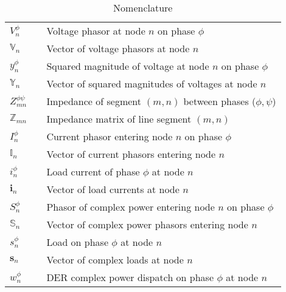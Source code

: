 \begin{table}[t]
\caption{Nomenclature}
\centering
\begin{tabulary}{\textwidth}{LLL}
	\hline
	\hline
\noindent $V_{n}^{\phi}$ & & Voltage phasor at node $n$ on phase $\phi$ \\
\noindent $\mathbb{V}_{n}$ & & Vector of voltage phasors at node $n$ \\
\noindent $y_{n}^{\phi}$ & & Squared magnitude of voltage at node $n$ on phase $\phi$ \\
\noindent $\mathbb{Y}_{n}$ & & Vector of squared magnitudes of voltages at node $n$ \\
\noindent $Z_{mn}^{\phi \psi}$ & & Impedance of segment $(m,n)$ between phases ($\phi,\psi$) \\
\noindent $\mathbb{Z}_{mn}$ & & Impedance matrix of line segment $(m,n)$ \\
\noindent $I_{n}^{\phi}$ & & Current phasor entering node $n$ on phase $\phi$ \\
\noindent $\mathbb{I}_{n}$ & & Vector of current phasors entering node $n$ \\
\noindent $i_{n}^{\phi}$ & & Load current of phase $\phi$ at node $n$ \\
\noindent $\mathbf{i}_{n}$ & & Vector of load currents at node $n$ \\
\noindent $S_{n}^{\phi}$ & & Phasor of complex power entering node $n$ on phase $\phi$ \\
\noindent $\mathbb{S}_{n}$ & & Vector of complex power phasors entering node $n$ \\
\noindent $s_{n}^{\phi}$ & & Load on phase $\phi$ at node $n$ \\
\noindent $\mathbf{s}_{n}$ & & Vector of complex loads at node $n$ \\
\noindent $w_{n}^{\phi}$ & & DER complex power dispatch on phase $\phi$ at node $n$ \\
  \hline
\end{tabulary}
\label{tab:notation}
\end{table}

